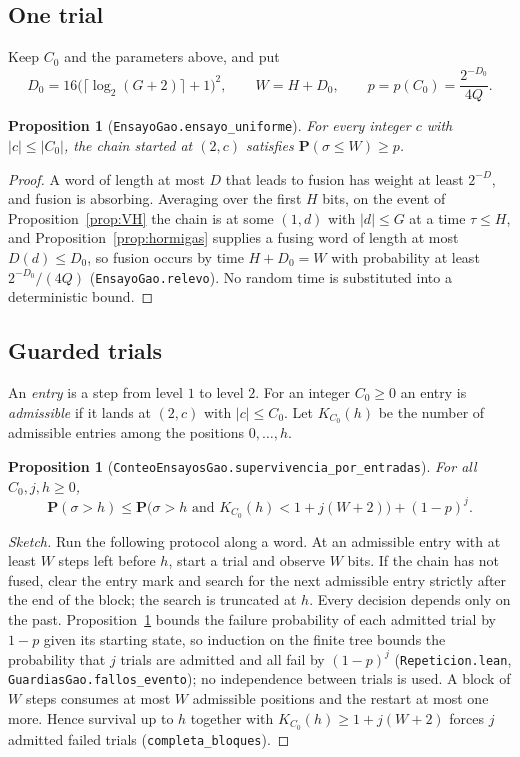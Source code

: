 \documentclass[11pt]{amsart}
\newtheorem{proposition}[theorem]{Proposition}
\theoremstyle{definition}
\theoremstyle{remark}
\newcommand{\Prob}{\mathbf{P}}
\newcommand{\lean}[1]{\nolinkurl{#1}}
\begin{document}
\subsection{One trial}
Keep $C_0$ and the parameters above, and put
\[
D_0=16\bigl(\lceil\log_2(G+2)\rceil+1\bigr)^2,\qquad W=H+D_0,\qquad p=p(C_0)=\frac{2^{-D_0}}{4Q}.
\]

\begin{proposition}[\lean{EnsayoGao.ensayo_uniforme}]\label{prop:EF}
For every integer $c$ with $|c|\le|C_0|$, the chain started at $(2,c)$ satisfies $\Prob(\sigma\le W)\ge p$.
\end{proposition}

\begin{proof}
A word of length at most $D$ that leads to fusion has weight at least $2^{-D}$, and fusion is absorbing. Averaging over the first $H$ bits, on the event of Proposition~\ref{prop:VH} the chain is at some $(1,d)$ with $|d|\le G$ at a time $\tau\le H$, and Proposition~\ref{prop:hormigas} supplies a fusing word of length at most $D(d)\le D_0$, so fusion occurs by time $H+D_0=W$ with probability at least $2^{-D_0}/(4Q)$ (\lean{EnsayoGao.relevo}). No random time is substituted into a deterministic bound.
\end{proof}

\subsection{Guarded trials}
An \emph{entry} is a step from level $1$ to level $2$. For an integer $C_0\ge0$ an entry is \emph{admissible} if it lands at $(2,c)$ with $|c|\le C_0$. Let $K_{C_0}(h)$ be the number of admissible entries among the positions $0,\dots,h$.

\begin{proposition}[\lean{ConteoEnsayosGao.supervivencia_por_entradas}]\label{prop:guarded}
For all $C_0,j,h\ge0$,
\[
\Prob(\sigma>h)\le \Prob\bigl(\sigma>h \text{ and } K_{C_0}(h)<1+j(W+2)\bigr)+(1-p)^j.
\]
\end{proposition}

\begin{proof}[Sketch]
Run the following protocol along a word. At an admissible entry with at least $W$ steps left before $h$, start a trial and observe $W$ bits. If the chain has not fused, clear the entry mark and search for the next admissible entry strictly after the end of the block; the search is truncated at $h$. Every decision depends only on the past. Proposition~\ref{prop:EF} bounds the failure probability of each admitted trial by $1-p$ given its starting state, so induction on the finite tree bounds the probability that $j$ trials are admitted and all fail by $(1-p)^j$ (\lean{Repeticion.lean}, \lean{GuardiasGao.fallos_evento}); no independence between trials is used. A block of $W$ steps consumes at most $W$ admissible positions and the restart at most one more. Hence survival up to $h$ together with $K_{C_0}(h)\ge 1+j(W+2)$ forces $j$ admitted failed trials (\lean{completa_bloques}).
\end{proof}
\end{document}
